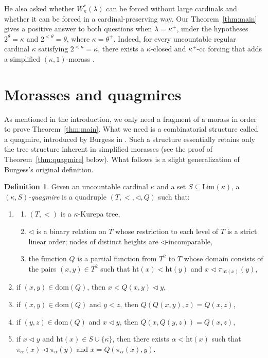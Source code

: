 \documentclass[]{amsart}
\theoremstyle{definition}
\newtheorem{definition}[theorem]{Definition}
\theoremstyle{remark}
\begin{document}
He also asked whether $W^*_\kappa(\lambda)$ can be forced without large cardinals and whether it can be forced in a cardinal-preserving way. Our Theorem~\ref{thm:main} gives a positive answer to both questions when $\lambda = \kappa^+$, under the hypotheses $2^{\theta} = \kappa$ and $2^{<\theta} = \theta$, where $\kappa = \theta^+$. Indeed, for every uncountable regular cardinal $\kappa$ satisfying $2^{<\kappa} = \kappa$, there exists a $\kappa$-closed and $\kappa^{+}$-cc forcing that adds a simplified $(\kappa, 1)$-morass \cite{MR736620}.



\section{Morasses and quagmires}\label{sec:quagmire}

As mentioned in the introduction, we only need a fragment of a morass in order to prove Theorem~\ref{thm:main}. What we need is a combinatorial structure called a quagmire, introduced by Burgess in \cite{MR555420}. Such a structure essentially retains only the tree structure inherent in simplified morasses (see the proof of Theorem~\ref{thm:quagmire} below). What follows is a slight generalization of Burgess's original definition.

\begin{definition}\label{def:quagmire}
Given an uncountable cardinal $\kappa$ and a set $S \subseteq \mathrm{Lim}(\kappa)$, a\linebreak \emph{$(\kappa, S)$-quagmire} is a quadruple $(T, {<}, {\lhd}, Q)$ such that:
\begin{enumerate}[label={(Q\arabic*)},  start=0]
\item 
\begin{enumerate}
\item $(T, <)$ is a $\kappa$-Kurepa tree,
\item $\lhd$ is a binary relation on $T$ whose restriction to each level of $T$ is a strict linear order; nodes of distinct heights are $\lhd$-incomparable,
\item the function $Q$ is a partial function from $T^2$ to $T$ whose domain consists of the pairs $(x, y) \in T^2$ such that $\mathrm{ht}(x) < \mathrm{ht}(y)$ and $x \lhd \pi_{\mathrm{ht}(x)}(y)$,
\end{enumerate}

\item if $(x, y) \in \mathrm{dom}(Q)$, then $x < Q(x, y) \lhd y$,
\item if $(x, y) \in \mathrm{dom}(Q)$ and $y < z$, then $Q(Q(x, y), z) = Q(x,z)$,
\item if $(y, z) \in \mathrm{dom}(Q)$ and $x \lhd y$, then $Q(x, Q(y, z)) = Q(x, z)$,
\item if $x \lhd y$ and $\mathrm{ht}(x) \in S \cup \{\kappa\}$, then there exists $\alpha < \mathrm{ht}(x)$ such that $\pi_\alpha(x) \lhd \pi_\alpha(y)$ and $x = Q(\pi_\alpha(x), y)$.
\end{enumerate}
\end{definition}
\end{document}

